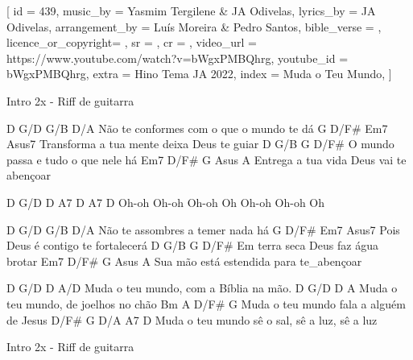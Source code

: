 [
    id                  = {439},
    music_by            = {Yasmim Tergilene & JA Odivelas}, %
    lyrics_by           = {JA Odivelas}, %
    arrangement_by      = {Luís Moreira & Pedro Santos}, %
    bible_verse         = {},
    licence_or_copyright= {},
    sr                  = {},
    cr                  = {},
    video_url           = {https://www.youtube.com/watch?v=bWgxPMBQhrg}, %
    youtube_id          = {bWgxPMBQhrg}, %
    extra               = {Hino Tema JA 2022},
    index               = {Muda o Teu Mundo},
]

\beginverse
Intro 2x - Riff de guitarra
\endverse

\beginverse
D         G/D                G/B      D/A	
Não te conformes com o que o mundo te dá
     G           D/F#        Em7        Asus7
Transforma a tua mente deixa Deus te guiar
D       G/B            G        D/F#
O mundo passa e tudo o que nele há
  Em7         D/F#          G        Asus A
Entrega a tua vida Deus vai te abençoar

D     G/D   D     A7   D     A7    D
Oh-oh Oh-oh Oh-oh Oh   Oh-oh Oh-oh Oh

\endverse

\beginverse
D       G/D          G/B      D/A
Não te assombres a temer nada há
     G         D/F#       Em7   Asus7
Pois Deus é contigo te fortalecerá
D        G/B           G       D/F#
Em terra seca Deus faz água brotar
    Em7           D/F#         G     Asus A
Sua mão está estendida para te_abençoar

\endverse

\beginchorus
D          G/D          D         A/D
Muda o teu mundo, com a Bíblia na mão.
D          G/D         D        A
Muda o teu mundo, de joelhos no chão
Bm         A             D/F#       G
Muda o teu mundo fala a alguém de Jesus
D/F#       G          D/A       A7        D
Muda o teu mundo sê o sal, sê a luz, sê a luz

\endchorus

\beginverse
Intro 2x - Riff de guitarra
\endverse

